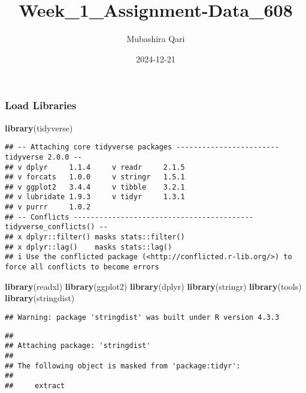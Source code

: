 \documentclass[
]{article}
\title{Week\_1\_Assignment-Data\_608}
\author{Mubashira Qari}
\date{2024-12-21}
\newenvironment{Shaded}{\begin{snugshade}}{\end{snugshade}}
\newcommand{\FunctionTok}[1]{\textcolor[rgb]{0.13,0.29,0.53}{\textbf{#1}}}
\newcommand{\NormalTok}[1]{#1}
\begin{document}
\maketitle

\subsubsection{Load Libraries}\label{load-libraries}

\begin{Shaded}
\begin{Highlighting}[]
\FunctionTok{library}\NormalTok{(tidyverse)}
\end{Highlighting}
\end{Shaded}

\begin{verbatim}
## -- Attaching core tidyverse packages ------------------------ tidyverse 2.0.0 --
## v dplyr     1.1.4     v readr     2.1.5
## v forcats   1.0.0     v stringr   1.5.1
## v ggplot2   3.4.4     v tibble    3.2.1
## v lubridate 1.9.3     v tidyr     1.3.1
## v purrr     1.0.2     
## -- Conflicts ------------------------------------------ tidyverse_conflicts() --
## x dplyr::filter() masks stats::filter()
## x dplyr::lag()    masks stats::lag()
## i Use the conflicted package (<http://conflicted.r-lib.org/>) to force all conflicts to become errors
\end{verbatim}

\begin{Shaded}
\begin{Highlighting}[]
\FunctionTok{library}\NormalTok{(readxl)}
\FunctionTok{library}\NormalTok{(ggplot2)}
\FunctionTok{library}\NormalTok{(dplyr)}
\FunctionTok{library}\NormalTok{(stringr)}
\FunctionTok{library}\NormalTok{(tools)}
\FunctionTok{library}\NormalTok{(stringdist)}
\end{Highlighting}
\end{Shaded}

\begin{verbatim}
## Warning: package 'stringdist' was built under R version 4.3.3
\end{verbatim}

\begin{verbatim}
## 
## Attaching package: 'stringdist'
## 
## The following object is masked from 'package:tidyr':
## 
##     extract
\end{verbatim}
\end{document}
